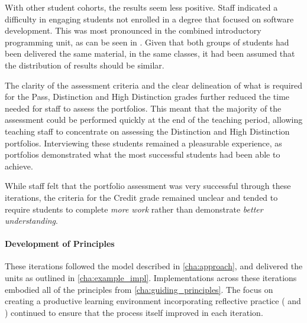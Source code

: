 With other student cohorts, the results seem less positive. Staff indicated a difficulty in engaging students not enrolled in a degree that focused on software development. This was most pronounced in the combined introductory programming unit, as can be seen in . Given that both groups of students had been delivered the same material, in the same classes, it had been assumed that the distribution of results should be similar. 



The clarity of the assessment criteria and the clear delineation of what is required for the Pass, Distinction and High Distinction grades further reduced the time needed for staff to assess the portfolios. This meant that the majority of the assessment could be performed quickly at the end of the teaching period, allowing teaching staff to concentrate on assessing the Distinction and High Distinction portfolios. Interviewing these students remained a pleasurable experience, as portfolios demonstrated what the most successful students had been able to achieve.

While staff felt that the portfolio assessment was very successful through these iterations, the criteria for the Credit grade remained unclear and tended to require students to complete \emph{more work} rather than demonstrate \emph{better understanding}.

\paragraph{Development of Principles} %

These iterations followed the model described in \cref{cha:approach}, and delivered the units as outlined in \cref{cha:example_impl}. Implementations across these iterations embodied all of the principles from \cref{cha:guiding_principles}. The focus on creating a productive learning environment incorporating reflective practice ( and ) continued to ensure that the process itself improved in each iteration.


